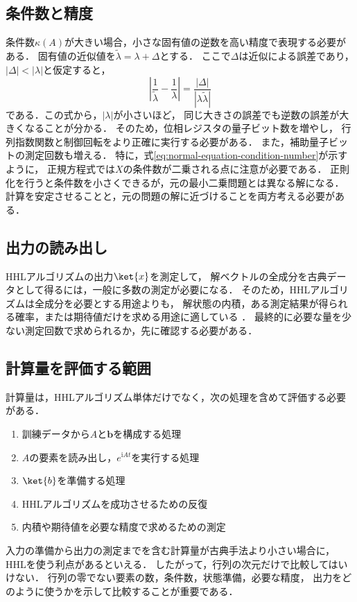 \subsection{条件数と精度}
\label{subsec:condition-number-and-precision}

条件数$\kappa(A)$が大きい場合，小さな固有値の逆数を高い精度で表現する必要がある．
固有値の近似値を$\widetilde\lambda=\lambda+\Delta$とする．
ここで$\Delta$は近似による誤差であり，
$|\Delta|<|\lambda|$と仮定すると，
\begin{equation}
 \left|\frac1{\widetilde\lambda}-\frac1\lambda\right|
 =\frac{|\Delta|}{|\lambda\widetilde\lambda|}
 \label{eq:reciprocal-eigenvalue-error}
\end{equation}
である．この式から，$|\lambda|$が小さいほど，
同じ大きさの誤差でも逆数の誤差が大きくなることが分かる．
そのため，位相レジスタの量子ビット数を増やし，
行列指数関数と制御回転をより正確に実行する必要がある．
また，補助量子ビットの測定回数も増える．
特に，式\eqref{eq:normal-equation-condition-number}が示すように，
正規方程式では$X$の条件数が二乗される点に注意が必要である．
正則化を行うと条件数を小さくできるが，元の最小二乗問題とは異なる解になる．
計算を安定させることと，元の問題の解に近づけることを両方考える必要がある．

\subsection{出力の読み出し}
\label{subsec:solution-readout}

HHLアルゴリズムの出力$\ket{x}$を測定して，
解ベクトルの全成分を古典データとして得るには，一般に多数の測定が必要になる．
そのため，HHLアルゴリズムは全成分を必要とする用途よりも，
解状態の内積，ある測定結果が得られる確率，または期待値だけを求める用途に適している
\cite{shimada2020}．
最終的に必要な量を少ない測定回数で求められるか，先に確認する必要がある．

\subsection{計算量を評価する範囲}
\label{subsec:end-to-end-evaluation}

計算量は，HHLアルゴリズム単体だけでなく，次の処理を含めて評価する必要がある．

\begin{enumerate}[(1)]
  \item 訓練データから$A$と$\bm{b}$を構成する処理
  \item $A$の要素を読み出し，$e^{\mathrm{i}At}$を実行する処理
  \item $\ket{b}$を準備する処理
  \item HHLアルゴリズムを成功させるための反復
  \item 内積や期待値を必要な精度で求めるための測定
\end{enumerate}

入力の準備から出力の測定までを含む計算量が古典手法より小さい場合に，
HHLを使う利点があるといえる．
したがって，行列の次元だけで比較してはいけない．
行列の零でない要素の数，条件数，状態準備，必要な精度，
出力をどのように使うかを示して比較することが重要である．
